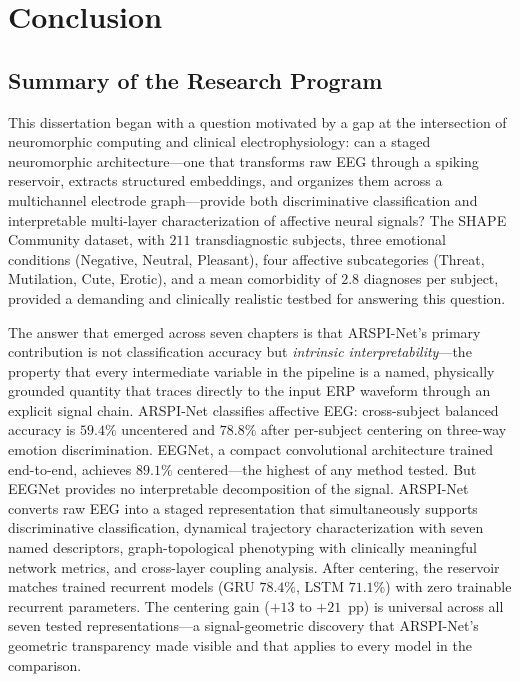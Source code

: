 \chapter{Conclusion}
\label{chap:conclusion}

\section{Summary of the Research Program}

This dissertation began with a question motivated by a gap at the intersection of neuromorphic computing and clinical electrophysiology: can a staged neuromorphic architecture---one that transforms raw EEG through a spiking reservoir, extracts structured embeddings, and organizes them across a multichannel electrode graph---provide both discriminative classification and interpretable multi-layer characterization of affective neural signals? The SHAPE Community dataset, with $211$ transdiagnostic subjects, three emotional conditions (Negative, Neutral, Pleasant), four affective subcategories (Threat, Mutilation, Cute, Erotic), and a mean comorbidity of $2.8$ diagnoses per subject, provided a demanding and clinically realistic testbed for answering this question.

The answer that emerged across seven chapters is that ARSPI-Net's primary contribution is not classification accuracy but \emph{intrinsic interpretability}---the property that every intermediate variable in the pipeline is a named, physically grounded quantity that traces directly to the input ERP waveform through an explicit signal chain. ARSPI-Net classifies affective EEG: cross-subject balanced accuracy is $59.4\%$ uncentered and $78.8\%$ after per-subject centering on three-way emotion discrimination. EEGNet, a compact convolutional architecture trained end-to-end, achieves $89.1\%$ centered---the highest of any method tested. But EEGNet provides no interpretable decomposition of the signal. ARSPI-Net converts raw EEG into a staged representation that simultaneously supports discriminative classification, dynamical trajectory characterization with seven named descriptors, graph-topological phenotyping with clinically meaningful network metrics, and cross-layer coupling analysis. After centering, the reservoir matches trained recurrent models (GRU $78.4\%$, LSTM $71.1\%$) with zero trainable recurrent parameters. The centering gain ($+13$ to $+21$~pp) is universal across all seven tested representations---a signal-geometric discovery that ARSPI-Net's geometric transparency made visible and that applies to every model in the comparison.


